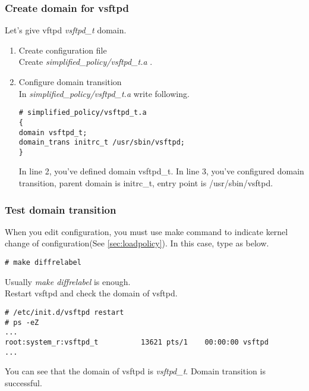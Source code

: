 \subsubsection{Create domain for vsftpd}
Let's give vftpd {\it vsftpd\_t} domain.
\begin{enumerate}
 \item Create configuration file\\
Create {\it simplified\_policy/vsftpd\_t.a }. 
 \item Configure domain transition\\
 In {\it simplified\_policy/vsftpd\_t.a} write following.
\begin{verbatim}
# simplified_policy/vsftpd_t.a
{
domain vsftpd_t;
domain_trans initrc_t /usr/sbin/vsftpd;
}
\end{verbatim}

In line 2, you've defined domain vsftpd\_t.  In line 3, you've configured
       domain transition, parent domain is initrc\_t, entry point is /usr/sbin/vsftpd.

\end{enumerate}

\subsubsection{Test domain transition}
When you edit configuration, you must use make command to indicate
kernel change of configuration(See \ref{sec:loadpolicy}). In this case, type as below.\\
\begin{verbatim}
# make diffrelabel
\end{verbatim}
Usually {\it make diffrelabel } is enough.\\
Restart vsftpd and check the domain of vsftpd.
\begin{verbatim}
# /etc/init.d/vsftpd restart
# ps -eZ
...
root:system_r:vsftpd_t          13621 pts/1    00:00:00 vsftpd
...
\end{verbatim}
You can see that the domain of vsftpd is {\it vsftpd\_t}. Domain transition
is successful.

